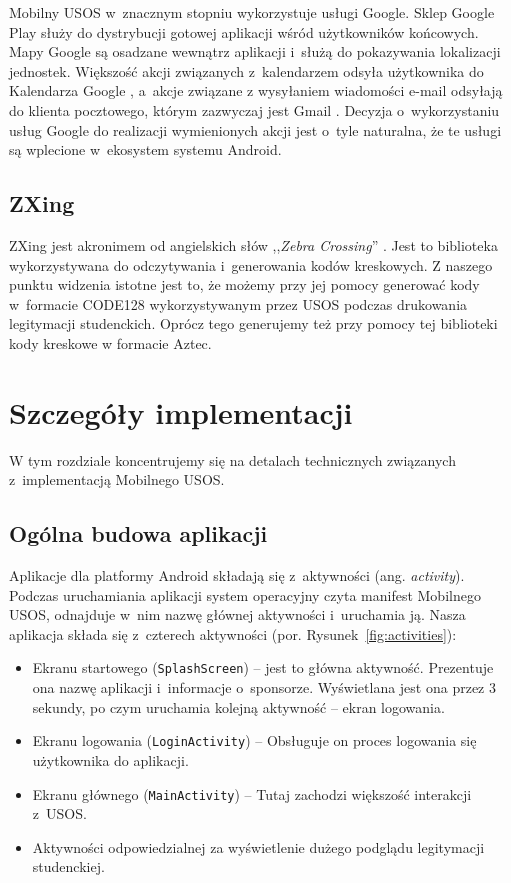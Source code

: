 \documentclass{pracamgr}
\begin{document}
Mobilny USOS w~znacznym stopniu wykorzystuje usługi Google. Sklep Google Play
\cite{googleplay} służy do dystrybucji gotowej aplikacji wśród użytkowników
końcowych. Mapy Google \cite{googlemaps} są osadzane wewnątrz aplikacji i~służą
do pokazywania lokalizacji jednostek. Większość akcji związanych z~kalendarzem
odsyła użytkownika do Kalendarza Google \cite{googlecalendar}, a~akcje związane
z wysyłaniem wiadomości e-mail odsyłają do klienta pocztowego, którym zazwyczaj
jest Gmail \cite{gmail}. Decyzja o~wykorzystaniu usług Google do realizacji
wymienionych akcji jest o~tyle naturalna, że te usługi są wplecione w~ekosystem
systemu Android.

\section{ZXing}

ZXing jest akronimem od angielskich słów ,,\textit{Zebra Crossing}'' \cite{zxing}.
Jest to biblioteka wykorzystywana do odczytywania i~generowania kodów kreskowych.
Z naszego punktu widzenia istotne jest to, że możemy przy jej pomocy generować
kody w~formacie CODE128 wykorzystywanym przez USOS podczas drukowania legitymacji
studenckich. Oprócz tego generujemy też przy pomocy tej biblioteki kody kreskowe
w formacie Aztec.

\chapter{Szczegóły implementacji}

W tym rozdziale koncentrujemy się na detalach technicznych związanych z~implementacją
Mobilnego USOS.

\section{Ogólna budowa aplikacji}

Aplikacje dla platformy Android składają się z~aktywności (ang. \textit{activity}).
Podczas uruchamiania aplikacji system operacyjny czyta manifest Mobilnego USOS,
odnajduje w~nim nazwę głównej aktywności i~uruchamia ją. Nasza aplikacja składa
się z~czterech aktywności (por. Rysunek~\ref{fig:activities}):

\begin{itemize}
	\item Ekranu startowego (\texttt{SplashScreen}) -- jest to główna aktywność.
	      Prezentuje ona nazwę aplikacji i~informacje o~sponsorze. Wyświetlana
	      jest ona przez 3 sekundy, po czym uruchamia kolejną aktywność -- ekran
	      logowania.
	\item Ekranu logowania (\texttt{LoginActivity}) -- Obsługuje on proces logowania się
	      użytkownika do aplikacji.
	\item Ekranu głównego (\texttt{MainActivity}) -- Tutaj zachodzi większość interakcji
	      z~USOS.
	\item Aktywności odpowiedzialnej za wyświetlenie dużego podglądu legitymacji
	      studenckiej.
\end{itemize}
\end{document}
